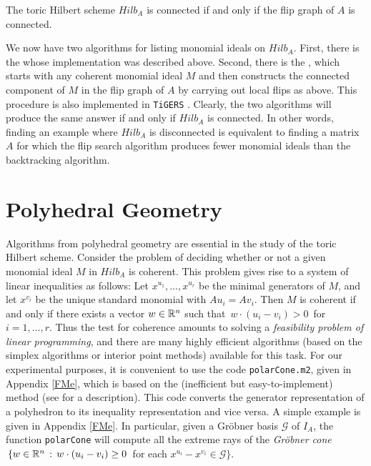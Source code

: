 \begin{theorem} 
The toric Hilbert scheme $Hilb_A$ is connected if and only if the 
flip graph of $A$ is connected.
\end{theorem}

We now have two algorithms for listing monomial ideals on $Hilb_A$.
First, there is the {\it {}} whose \Mtwo
implementation was described above.  Second, there is the {\it {}}, which starts with any coherent monomial ideal $M$
and then constructs the connected component of $M$ in the flip graph
of $A$ by carrying out local flips as above.  This procedure is also 
implemented in {\tt TiGERS} \cite{HS:HT}. Clearly, the two algorithms
will produce the same answer if and only if $Hilb_A$ is connected. In
other words, finding an example where $Hilb_A$ is disconnected is
equivalent to finding a matrix $A$ for which the flip search algorithm
produces fewer monomial ideals than the backtracking algorithm.

\section{Polyhedral Geometry}

Algorithms from polyhedral geometry are essential in the study of the
toric Hilbert scheme. Consider the problem of deciding whether or not
a given monomial ideal $M$ in $Hilb_A$ is coherent.  This problem
gives rise to a system of linear inequalities as follows: Let
$x^{u_1}, \ldots, x^{u_r}$ be the minimal generators of $M$, and let
$x^{v_i}$ be the unique standard monomial with $A u_i = A v_i$. Then
$M$ is coherent if and only if there exists a vector $w \in \mathbb{R}^n$ such
that $\,w \cdot (u_i - v_i) > 0\,$ for $i =1,\ldots,r$.  Thus the test
for coherence amounts to solving a {\sl feasibility problem of linear
programming}, and there are many highly efficient algorithms (based on
the simplex algorithms or interior point methods) available for this
task. For our experimental purposes, it is convenient to use the code
{\tt polarCone.m2}, given in Appendix \ref{FMe}, which is based on the
(inefficient but easy-to-implement) {\em {}}
method (see \cite{HS:Zie} for a description).  This code converts the
generator representation of a polyhedron to its inequality
representation and vice versa. A simple example is given in Appendix
\ref{FMe}. In particular, given a Gr\"obner basis $\mathcal G$ of $I_A$, the
function {\tt polarCone} will compute all the extreme rays of the {\em
Gr\"obner cone} $\,\{ w \in \mathbb{R}^n \,: \,w \cdot (u_i - v_i) \geq 0\,$
for each $x^{u_i}-x^{v_i} \in {\mathcal G}\}.$

